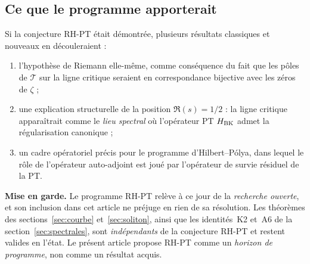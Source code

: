 \subsection{Ce que le programme apporterait}
\label{sec:programme:portee}

Si la conjecture RH-PT était démontrée, plusieurs résultats classiques et nouveaux en découleraient :
\begin{enumerate}[nosep,leftmargin=*]
\item l'hypothèse de Riemann elle-même, comme conséquence du fait que les pôles de $\mathcal T$ sur la ligne critique seraient en correspondance bijective avec les zéros de $\zeta$ ;
\item une explication structurelle de la position $\Re(s) = 1/2$ : la ligne critique apparaîtrait comme le \emph{lieu spectral} où l'opérateur PT $H_{\rm BK}$ admet la régularisation canonique ;
\item un cadre opératoriel précis pour le programme d'Hilbert--Pólya, dans lequel le rôle de l'opérateur auto-adjoint est joué par l'opérateur de survie résiduel de la PT.
\end{enumerate}

\textbf{Mise en garde.} Le programme RH-PT relève à ce jour de la \emph{recherche ouverte}, et son inclusion dans cet article ne préjuge en rien de sa résolution. Les théorèmes des sections~\ref{sec:courbe} et~\ref{sec:soliton}, ainsi que les identités~K2 et~A6 de la section~\ref{sec:spectrales}, sont \emph{indépendants} de la conjecture RH-PT et restent valides en l'état. Le présent article propose RH-PT comme un \emph{horizon de programme}, non comme un résultat acquis.
